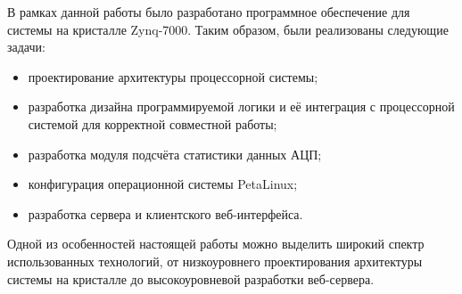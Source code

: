 В рамках данной работы было разработано программное обеспечение для системы на кристалле Zynq-7000. Таким образом, были реализованы следующие задачи:\par
\begin{itemize}
    \item проектирование архитектуры процессорной системы;
    \item разработка дизайна программируемой логики и её интеграция с процессорной системой для корректной совместной работы;
    \item разработка модуля подсчёта статистики данных АЦП;
    \item конфигурация операционной системы PetaLinux;
    \item разработка сервера и клиентского веб-интерфейса.
\end{itemize}\par
Одной из особенностей настоящей работы можно выделить широкий спектр использованных технологий, от низкоуровнего проектирования архитектуры системы на кристалле до высокоуровневой разработки веб-сервера.

